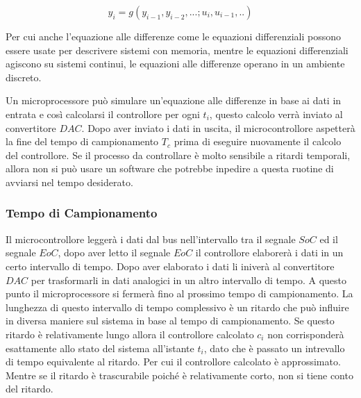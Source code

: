 \documentclass{article}
\numberwithin{equation}{subsection}
\begin{document}
\begin{equation}
    y_i=g(y_{i-1},y_{i-2},...;u_{i},u_{i-1},..)
\end{equation}

Per cui anche l'equazione alle differenze come le equazioni differenziali possono essere usate per descrivere sistemi con memoria, mentre le equazioni differenziali agiscono 
su sistemi continui, le equazioni alle differenze operano in un ambiente discreto. 

\begin{center}\end{center}

Un microprocessore può simulare un'equazione alle differenze in base ai dati in entrata e così calcolarsi il controllore per ogni $t_i$, questo calcolo verrà inviato al 
convertitore $DAC$. Dopo aver inviato i dati in uscita, il microcontrollore aspetterà la fine del tempo di campionamento $T_c$ prima di eseguire nuovamente il calcolo 
del controllore. Se il processo da controllare è molto sensibile a ritardi temporali, allora non si può usare un software che potrebbe inpedire a questa ruotine di 
avviarsi nel tempo desiderato. 

\subsubsection{Tempo di Campionamento}

Il microcontrollore leggerà i dati dal bus nell'intervallo tra il segnale $SoC$ ed il segnale $EoC$, dopo aver letto il segnale $EoC$ il controllore elaborerà i dati 
in un certo intervallo di tempo. Dopo aver elaborato i dati li iniverà al convertitore $DAC$ per trasformarli in dati analogici in un altro intervallo di tempo. A questo 
punto il microprocessore si fermerà fino al prossimo tempo di campionamento. La lunghezza di questo intervallo di tempo complessivo è un ritardo che può influire in diversa 
maniere sul sistema in base al tempo di campionamento. Se questo ritardo è relativamente lungo allora il controllore calcolato $c_i$ non corrisponderà esattamente allo stato 
del sistema all'istante $t_i$, dato che è passato un intrevallo di tempo equivalente al ritardo. Per cui il controllore calcolato è approssimato. Mentre se il ritardo è 
trascurabile poiché è relativamente corto, non si tiene conto del ritardo. 
\end{document}
